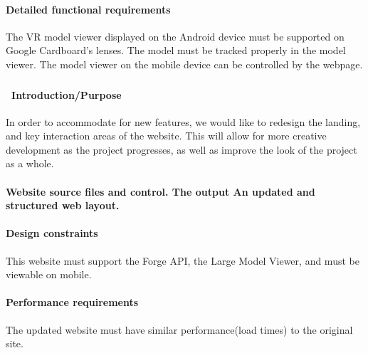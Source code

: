 \documentclass[letterpaper, 10pt, draftclsnofoot, compsoc, onecolumn]{IEEEtran}
\begin{document}
{\paragraph[Detailed functional requirements]{\rmfamily\bfseries\color{black}
Detailed functional requirements }
{\color{black}
The VR model viewer displayed on the Android device must be supported on Google Cardboard's lenses. The model must be tracked properly in the model viewer. The model viewer on the mobile device can be controlled by the webpage.  }



\subsubsection[{Website Redesign}]{\rmfamily\bfseries\color{black} }
\paragraph[\ Purpose]{\foreignlanguage{english}{\ }\foreignlanguage{english}{Introduction/Purpose
}}
{\color{black}
In order to accommodate for new features, we would like to redesign the landing,
and key interaction areas of the website. This will allow for more creative development
as the project progresses, as well as improve the look of the project as a whole.}

\paragraph[Input/Output sequence]{\rmfamily\bfseries\color{black}
Website source files and control. The output An updated and structured web layout.}

\paragraph[Design constraints]{\rmfamily\bfseries\color{black} Design
constraints }
{\color{black}
This website must support the Forge API, the Large Model Viewer, and must be viewable on mobile. }

\paragraph[Performance requirements]{\rmfamily\bfseries\color{black}
Performance requirements }
{\color{black}
The updated website must have similar performance(load times) to the original site.}

}
\end{document}
